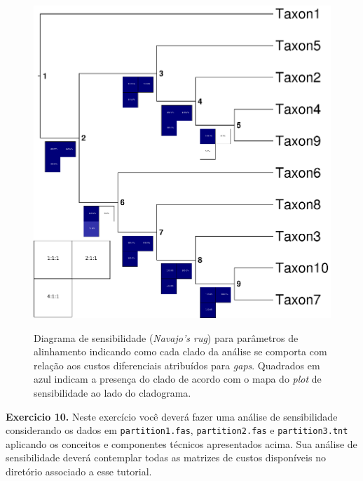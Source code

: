 \begin{refsection}
  \begin{figure}[H]
      {\includegraphics[scale=0.9]{figures/tut10/sensibilidade.eps}}
	{\caption[Diagrama de sensibilidade (\textit{Navajo's rug}) para parâmetros de alinhamento.]{Diagrama de sensibilidade (\textit{Navajo's rug}) para parâmetros de alinhamento indicando como cada clado da análise se comporta com relação aos custos diferenciais atribuídos para \textit{gaps}. Quadrados em azul indicam a presença do clado de acordo com o mapa do \textit{plot} de sensibilidade ao lado do cladograma.}\label{tut10:fig:sensitivity}}
  \end{figure}


\begin{blackBlock}{\textbf{Exercicio 10.}}\label{tut10:ex:10.1}
Neste exercício você deverá fazer uma análise de sensibilidade considerando os dados em \texttt{partition1.fas}, \texttt{partition2.fas} e \texttt{partition3.tnt} aplicando os conceitos e componentes técnicos apresentados acima. Sua análise de sensibilidade deverá contemplar todas as matrizes de custos disponíveis no diretório associado a esse tutorial.


\end{blackBlock}
\end{refsection}
